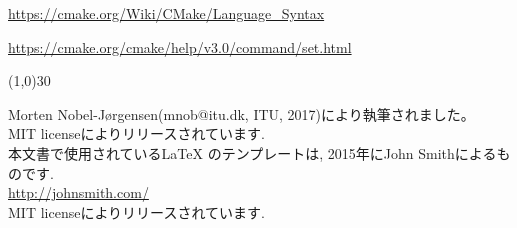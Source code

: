 \documentclass[uplatex,11pt,a4paper,landscape,dvipdfmx]{jsarticle} %
\begin{document}
\begin{multicols}{2}
\url{https://cmake.org/Wiki/CMake/Language_Syntax}

\url{https://cmake.org/cmake/help/v3.0/command/set.html}


\vspace{\baselineskip}
\linethickness{0.5mm} %
{\color{mygray}\line(1,0){30}} %

\footnotesize{
Morten Nobel-Jørgensen(mnob@itu.dk, ITU, 2017)により執筆されました。\\ 
MIT licenseによりリリースされています. \\

本文書で使用されている{\LaTeX} のテンプレートは, 2015年にJohn Smithによるものです.\\ 
\url{http://johnsmith.com/}\\
				
MIT licenseによりリリースされています. 
}

\end{multicols}

\end{document}
